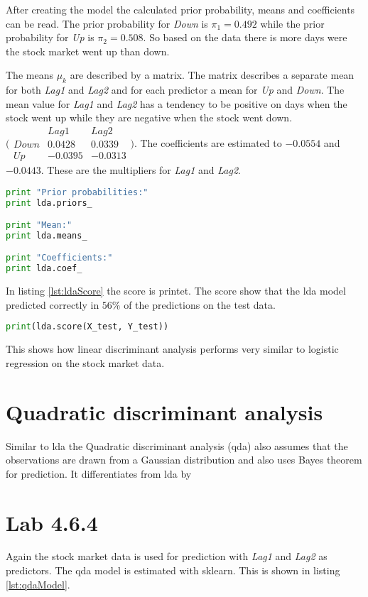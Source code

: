After creating the model the calculated prior probability, means and coefficients can be read. The prior probability for \emph{Down} is $\pi_1=0.492$ while the prior probability for \emph{Up} is $\pi_2=0.508$. So based on the data there is more days were the stock market went up than down. 

The means $\mu_k$ are described by a matrix. The matrix describes a separate mean for both \emph{Lag1} and \emph{Lag2} and for each predictor a mean for \emph{Up} and \emph{Down}. The mean value for \emph{Lag1} and \emph{Lag2} has a tendency to be positive on days when the stock went up while they are negative when the stock went down.  $\bigl( \begin{smallmatrix} 	 & Lag1 & Lag2	\\ 	 Down & 0.0428 & 0.0339 \\ 	 Up & -0.0395 & -0.0313 \end{smallmatrix} \bigr) $. The coefficients are estimated to $-0.0554$ and $-0.0443$. These are the multipliers for \emph{Lag1} and \emph{Lag2}.

\begin{lstlisting}[language=Python, label=lst:ldaProperties, caption=printing lda prior mean and coefficients]
print "Prior probabilities:"
print lda.priors_

print "Mean:"
print lda.means_

print "Coefficients:"
print lda.coef_
\end{lstlisting}

In listing \ref{lst:ldaScore} the score is printet. The score show that the lda model predicted correctly in $56\%$ of the predictions on the test data. 
\begin{lstlisting}[language=Python, label=lst:ldaScore, caption=printing lda score]
print(lda.score(X_test, Y_test))
\end{lstlisting}

This shows how linear discriminant analysis performs very similar to logistic regression on the stock market data.

\section{Quadratic discriminant analysis}
Similar to lda the Quadratic discriminant analysis (qda) also assumes that the observations are drawn from a Gaussian distribution and also uses Bayes theorem for prediction. It differentiates from lda by 

\section{Lab 4.6.4}
Again the stock market data is used for prediction with \emph{Lag1} and \emph{Lag2} as predictors. The qda model is estimated with sklearn. This is shown in listing \ref{lst:qdaModel}.

